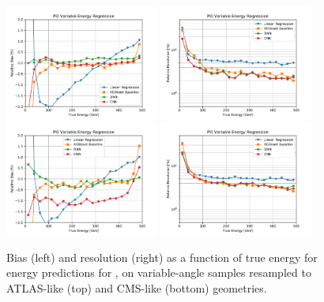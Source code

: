 \begin{figure}[htbp]
\centering
\includegraphics[width=0.45\textwidth]{Images/Calo/bias_vs_E_Pi0_variable_ATLAS.pdf}
\includegraphics[width=0.45\textwidth]{Images/Calo/res_vs_E_Pi0_variable_ATLAS.pdf} \\
\includegraphics[width=0.45\textwidth]{Images/Calo/bias_vs_E_Pi0_variable_CMS.pdf}
\includegraphics[width=0.45\textwidth]{Images/Calo/res_vs_E_Pi0_variable_CMS.pdf}
\caption{Bias (left) and resolution (right) as a function of true energy for energy predictions for \pizero, on variable-angle samples resampled to  ATLAS-like (top) and CMS-like (bottom) geometries.\label{fig:reg_resampled_pi0_ATLAS_CMS}}
\end{figure}

